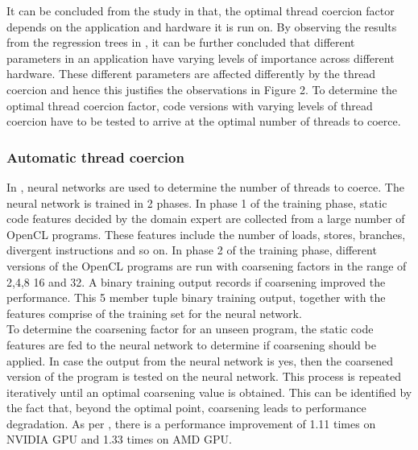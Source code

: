 \documentclass[a4paper,11pt]{article}
\begin{document}
  \indent It can be concluded from the study in \cite{threadseminal} that, the optimal thread coercion factor depends on the application and hardware it is run on. By observing the results from the regression trees in \cite{threadseminal}, it can be further concluded that different parameters in an application have varying levels of importance across different hardware. These different parameters are affected differently by the thread coercion and hence this justifies the observations in Figure 2. To determine the optimal thread coercion factor, code versions with varying levels of thread coercion have to be tested to arrive at the optimal number of threads to coerce. 
  \subsubsection{Automatic thread coercion}
  \indent\indent In \cite{threadautomatic}, neural networks are used to determine the number of threads to coerce. The neural network is trained in 2 phases. In phase 1 of the training phase, static code features decided by the domain expert are collected from a large number of OpenCL programs. These features include the number of loads, stores, branches, divergent instructions and so on. In phase 2 of the training phase, different versions of the OpenCL programs are run with coarsening factors in the range of 2,4,8 16 and 32. A binary training output records if coarsening improved the performance.  This 5 member tuple binary training output, together with the features comprise of the training set for the neural network.\\
  \indent To determine the coarsening factor for an unseen program, the static code features are fed to the neural network to determine if coarsening should be applied. In case the output from the neural network is yes, then the coarsened version of the program is tested on the neural network. This process is repeated iteratively until an optimal coarsening value is obtained. This can be identified by the fact that, beyond the optimal point, coarsening leads to performance degradation. As per \cite{threadautomatic}, there is a performance improvement of 1.11 times on NVIDIA GPU and 1.33 times on AMD GPU.
\end{document}
